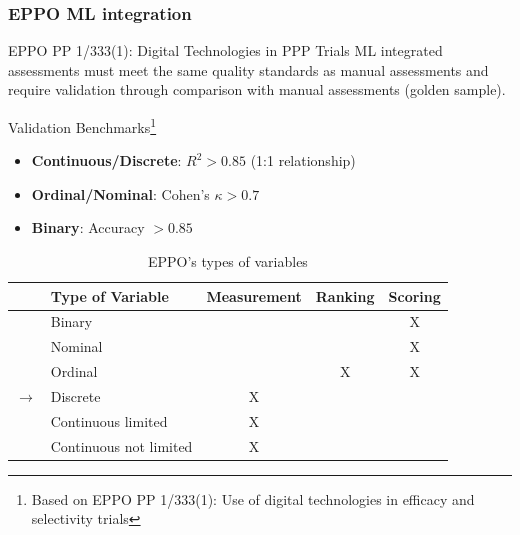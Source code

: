 \documentclass[aspectratio=43]{beamer}
\begin{document}
\begin{frame}
    \frametitle{EPPO ML integration}
    
    \begin{block}{EPPO PP 1/333(1): Digital Technologies in PPP Trials}
        \small
        ML integrated assessments must meet the same quality standards as manual assessments and require validation through comparison with manual assessments (golden sample).
    \end{block}
    
    \begin{exampleblock}{\small Validation Benchmarks\footnote{\tiny Based on EPPO PP 1/333(1): Use of digital technologies in efficacy and selectivity trials}}
        \scriptsize
        \begin{itemize}
            \item \textbf{\large Continuous/Discrete}\large : $R^2 > 0.85$ (1:1 relationship)
            \item \textbf{\large Ordinal/Nominal}\large : Cohen's $\kappa > 0.7$
            \item \textbf{\large Binary}\large : Accuracy $> 0.85$
        \end{itemize}
    \end{exampleblock}
\end{frame}

\begin{frame}
    \begin{table}[ht]
        \caption{\small EPPO's types of variables}
        \label{tab:data_types_slide}
        \centering
        \begin{tabular}{|c|l|c|c|c|}
        \hline
        & \textbf{Type of Variable} & \textbf{Measurement} & \textbf{Ranking} & \textbf{Scoring} \\
        \hline
        \rowcolor{red!20} & Binary & & & X \\
        \hline
        \rowcolor{red!20} & Nominal & & & X \\
        \hline
        \rowcolor{red!20} & Ordinal & & X & X \\
        \hline
        \rowcolor{yellow!75} $\rightarrow$ & Discrete & X & & \\
        \hline
        \rowcolor{green!20} & Continuous limited & X & & \\
        \hline
        \rowcolor{green!20} & Continuous not limited & X & & \\
        \hline
        \end{tabular}
    \end{table}
\end{frame}
\end{document}
